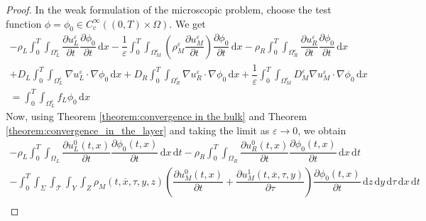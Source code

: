 \documentclass[11pt]{article}
\def\es{\varepsilon}
\def\orr{\Omega_R^\varepsilon}
\def\omm{\Omega_M^\varepsilon}
\def\oll{\Omega_L^\varepsilon}
\def\T{\mathcal{T}}
\newcommand{\di}[1]{\,\mathrm{d}#1}
\begin{document}
    \begin{proof}
         In the weak formulation of the microscopic problem, choose the test function $\phi=\phi_0 \in C_c^\infty ((0,T)\times \Omega)$. We get 
\begin{multline*}
    -\rho_L\int_0^T\int_{\oll}  \dfrac{\partial u_L^\es}{\partial t} \dfrac{\partial \phi_0}{\partial t} \di{x}-  \dfrac{1}{\es} \int_0^T\int_{\omm}  \left({\rho_M^\es} \dfrac{\partial u_M^\es}{\partial t}\right) \dfrac{\partial \phi_0}{\partial t}\di{x} -    \rho_R\int_0^T\int_{\orr} \dfrac{\partial u_R^\es}{\partial t} \dfrac{\partial \phi_0}{\partial t}\di{x}\\
    +D_L\int_0^T\int_{\oll}\nabla u_L^\es \cdot \nabla \phi_0   \di{x} + D_R\int_0^T\int_{\orr} \nabla u_R^\es\cdot\nabla \phi_0 \di{x} 
    + \dfrac{1}{\es}\int_0^T\int_{\omm}  D_M^\es  \nabla u_M^\es\cdot\nabla \phi_0 \di{x}\\
    = \int_0^T\int_{\oll} f_L\phi_0 \di{x}
\end{multline*}
Now, using Theorem \ref{theorem:convergence in the bulk} and Theorem \ref{theorem:convergence_in_the_layer} and taking the limit as $\es\rightarrow 0$, we obtain 
\begin{multline*}
    -\rho_L\int_0^T\int_{\Omega_L}  \dfrac{\partial u_L^0(t,x)}{\partial t} \dfrac{\partial \phi_0(t,x)}{\partial t} \di{x}\di{t}-    \rho_R\int_0^T\int_{\Omega_R} \dfrac{\partial u_R^0(t,x)}{\partial t} \dfrac{\partial \phi_0(t,x)}{\partial t}\di{x}\di{t}\\
    -  \int_0^T\int_{\Sigma}\int_\T\int_{Y}\int_Z  {\rho_M(t,\overline{x},\tau,y,z)} \left(\dfrac{\partial u_M^0(t,x)}{\partial t}+ \dfrac{\partial u_M^1(t,\overline{x},\tau,y)}{\partial \tau}\right) \dfrac{\partial \phi_0(t,x)}{\partial t}\di{z}\di{y}\di{\tau}\di{x}\di{t}\\

\end{multline*}
\end{proof}
\end{document}
